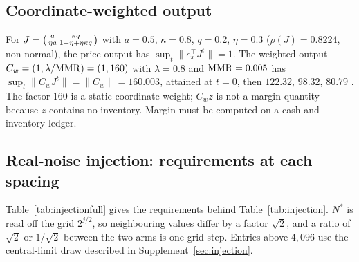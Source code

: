 \documentclass[12pt]{article}
\theoremstyle{definition}
\theoremstyle{remark}
\newcommand{\lab}[1]{}
\begin{document}
\subsection{Coordinate-weighted output}\label{app:coordw}
For $J=\begin{psmallmatrix}a&\kappa q\\ \eta a&1-\eta+\eta\kappa q\end{psmallmatrix}$ with $a=0.5$, $\kappa=0.8$, $q=0.2$, $\eta=0.3$ ($\rho(J)=0.8224$, non-normal), the price output has $\sup_t\|e_x^\top J^t\|=1$. The weighted output $C_w=(1,\lambda/{\rm MMR})=(1,160)$ with $\lambda=0.8$ and ${\rm MMR}=0.005$ has $\sup_t\|C_wJ^t\|=\|C_w\|=160.003$, attained at $t=0$, then $122.32$, $98.32$, $80.79$ \lab{recomputed in closed form}. The factor 160 is a static coordinate weight; $C_wz$ is not a margin quantity because $z$ contains no inventory. Margin must be computed on a cash-and-inventory ledger.

\subsection{Real-noise injection: requirements at each spacing}\label{app:injection}

Table~\ref{tab:injectionfull} gives the requirements behind Table~\ref{tab:injection}. $N^*$ is read off the grid $2^{j/2}$, so neighbouring values differ by a factor $\sqrt2$, and a ratio of $\sqrt2$ or $1/\sqrt2$ between the two arms is one grid step. Entries above $4{,}096$ use the central-limit draw described in Supplement~\ref{sec:injection}.
\end{document}
